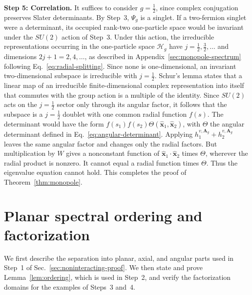 \documentclass[11pt,a4paper]{article}
\theoremstyle{remark}
\theoremstyle{plain}
\newcommand{\A}{\mathbf A}
\newcommand{\cH}{\mathcal H}
\begin{document}
\noindent\textbf{Step 5: Correlation.}
It suffices to consider $g=\tfrac12$, since complex conjugation
preserves Slater determinants.
By Step~3, $\Psi_g$ is a singlet.
If a two-fermion singlet were a determinant, its occupied rank-two
one-particle space would be invariant under the $SU(2)$ action of
Step~3. Under this action, the irreducible representations occurring in
the one-particle space $\cH_g$ have $j=\tfrac12,\tfrac32,\ldots$ and
dimensions $2j+1=2,4,\ldots$, as described in
Appendix~\ref{sec:monopole-spectrum} following Eq.~\eqref{eq:radial-splitting}.
Since none is one-dimensional, an invariant two-dimensional subspace
is irreducible with $j=\tfrac12$. Schur's lemma
\cite[Chap.~4]{Hall2015} states that a linear map of an irreducible
finite-dimensional complex representation into itself that commutes
with the group action is a multiple of the identity. Since $SU(2)$
acts on the $j=\tfrac12$ sector only through its angular factor, it
follows that the subspace is a $j=\tfrac12$ doublet with one common
radial function $f(s)$.
The determinant would have the form
$f(s_1)f(s_2)\Theta(\widehat{\mathbf x}_1,\widehat{\mathbf x}_2)$,
with $\Theta$ the angular determinant defined in
Eq.~\eqref{eq:angular-determinant}. Applying
$h^{v,\A_g}_1+h^{v,\A_g}_2$ leaves the same angular factor and changes
only the radial factors. But multiplication by $W$ gives a nonconstant
function of $\widehat{\mathbf x}_1\cdot\widehat{\mathbf x}_2$ times
$\Theta$, wherever the radial product is nonzero. It cannot equal a
radial function times $\Theta$. Thus the eigenvalue equation cannot hold.
This completes the proof of Theorem~\ref{thm:monopole}.

\appendix
\makeatletter
\renewcommand{\@seccntformat}[1]{%
  \@ifundefined{#1@cntformat}
    {\csname the#1\endcsname\quad}
    {\csname #1@cntformat\endcsname}}
\newcommand{\section@cntformat}{\appendixname~\thesection.\quad}
\makeatother

\section{Planar spectral ordering and factorization}
\label{app:planar}

We first describe the separation into planar, axial, and angular
parts used in Step~1 of Sec.~\ref{sec:noninteracting-proof}. We then state and prove
Lemma~\ref{lem:ordering}, which is used in
Step~2, and verify the factorization domains for the
examples of Steps~3 and~4.
\end{document}
